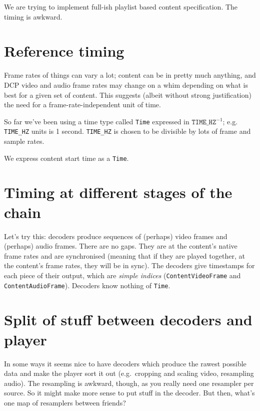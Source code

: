 \documentclass{article}
\begin{document}
We are trying to implement full-ish playlist based content specification.  The timing is awkward.

\section{Reference timing}

Frame rates of things can vary a lot; content can be in pretty much
anything, and DCP video and audio frame rates may change on a whim
depending on what is best for a given set of content.  This suggests
(albeit without strong justification) the need for a frame-rate-independent unit of time.

So far we've been using a time type called \texttt{Time} expressed in
$\mathtt{TIME\_HZ}^{-1}$; e.g. \texttt{TIME\_HZ} units is 1 second.
\texttt{TIME\_HZ} is chosen to be divisible by lots of frame and
sample rates.

We express content start time as a \texttt{Time}.


\section{Timing at different stages of the chain}

Let's try this: decoders produce sequences of (perhaps) video frames
and (perhaps) audio frames.  There are no gaps.  They are at the
content's native frame rates and are synchronised (meaning that if
they are played together, at the content's frame rates, they will be
in sync).  The decoders give timestamps for each piece of their
output, which are \emph{simple indices} (\texttt{ContentVideoFrame}
and \texttt{ContentAudioFrame}).  Decoders know nothing of \texttt{Time}.


\section{Split of stuff between decoders and player}

In some ways it seems nice to have decoders which produce the rawest
possible data and make the player sort it out (e.g.\ cropping and
scaling video, resampling audio).  The resampling is awkward, though,
as you really need one resampler per source.  So it might make more sense
to put stuff in the decoder.  But then, what's one map of resamplers between friends?
\end{document}
